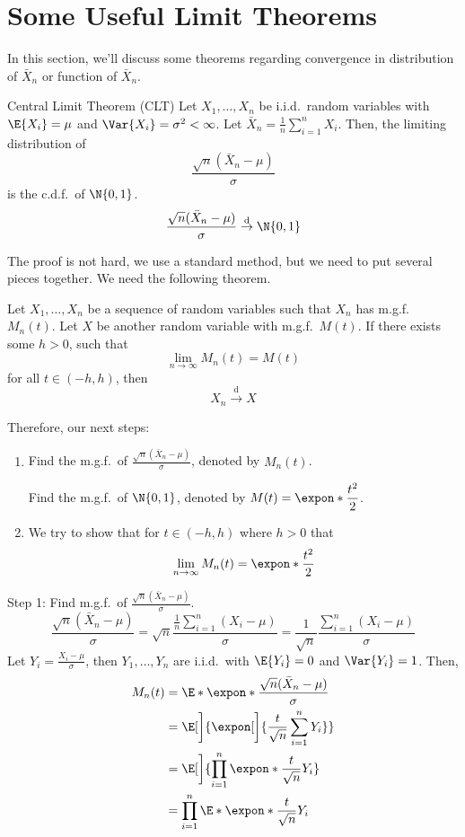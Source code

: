 \section{Some Useful Limit Theorems}
In this section, we'll discuss some theorems
regarding convergence in distribution of $ \bar{X}_n $
or function of $ \bar{X}_n $.
\begin{Theorem}{Central Limit Theorem (CLT)}{}
    Let $ X_1,\ldots,X_n $
    be i.i.d.\ random variables with $ \E{X_i}=\mu $
    and $ \Var{X_i}=\sigma^2<\infty $. Let
    $ \bar{X}_n=\frac{1}{n} \sum_{i=1}^{n} X_i $. Then,
    the limiting distribution of
    \[ \frac{\sqrt{n}(\bar{X}_n-\mu)}{\sigma} \]
    is the c.d.f.\ of $ \N{0,1} $.
    \[  \frac{\sqrt{n}(\bar{X}_n-\mu)}{\sigma}
        \stackrel{\text{d}}{\to}\N{0,1} \]
\end{Theorem}
The proof is not hard, we use a standard method,
but we need to put several pieces together.
We need the following theorem.
\begin{Theorem}{}{}
    Let $ X_1,\ldots,X_n $ be a sequence of
    random variables such that $ X_n $ has
    m.g.f.\ $ M_n(t) $. Let $ X $
    be another random variable with m.g.f.\
    $ M(t) $. If there exists some $ h>0 $, such that
    \[ \lim\limits_{{n} \to {\infty}} M_n(t)=M(t) \]
    for all $ t\in(-h,h) $, then
    \[ X_n \stackrel{\text{d}}{\to} X \]
\end{Theorem}
Therefore, our next steps:
\begin{enumerate}[label=(\arabic*)]
    \item Find the m.g.f.\ of
          $ \displaystyle \frac{\sqrt{n}(\bar{X}_n-\mu)}{\sigma} $, denoted by $ M_n(t) $.

          Find the m.g.f.\ of $ \N{0,1} $, denoted by $ \displaystyle M(t)=\expon*{\frac{t^2}{2}} $.
    \item We try to show that for $ t\in(-h,h) $ where $ h>0 $ that
          \[ \lim\limits_{{n} \to {\infty}}M_n(t)=\expon*{\frac{t^2}{2}}  \]
\end{enumerate}
Step 1: Find m.g.f.\ of $ \displaystyle \frac{\sqrt{n}(\bar{X}_n-\mu)}{\sigma} $.
\[
    \frac{\sqrt{n}(\bar{X}_n-\mu)}{\sigma}
    =\sqrt{n}\frac{\frac{1}{n} \sum_{i=1}^{n} (X_i-\mu)}{\sigma}
    =\frac{1}{\sqrt{n}} \frac{\sum_{i=1}^{n} (X_i-\mu)}{\sigma}
\]
Let $ \displaystyle Y_i=\frac{X_i-\mu}{\sigma} $, then
$ Y_1,\ldots,Y_n $ are i.i.d.\ with $ \E{Y_i}=0 $
and $ \Var{Y_i}=1 $. Then,
\begin{align*}
    M_n(t)
     & =\E*{\expon*{\frac{\sqrt{n}(\bar{X}_n-\mu)}{\sigma}}}            \\
     & =\E[\bigg]{\expon[\bigg]{\frac{t}{\sqrt{n}} \sum_{i=1}^{n} Y_i}} \\
     & =\E[\bigg]{\prod_{i=1}^n \expon*{\frac{t}{\sqrt{n}} Y_i}}        \\
     & =\prod_{i=1}^n\E*{\expon*{\frac{t}{\sqrt{n}} Y_i}}               \\
\end{align*}
